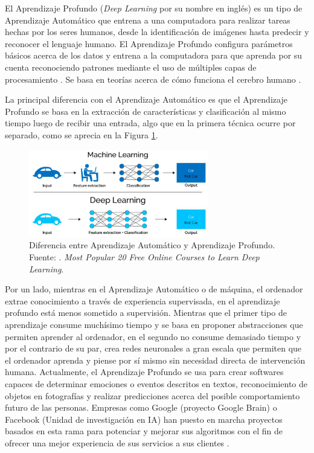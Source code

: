 El Aprendizaje Profundo (\textit{Deep Learning} por su nombre en inglés) es un tipo de Aprendizaje Automático que entrena a una computadora para realizar tareas hechas por los seres humanos, desde la identificación de imágenes hasta predecir y reconocer el lenguaje humano. El Aprendizaje Profundo configura parámetros básicos acerca de los datos y entrena a la computadora para que aprenda por su cuenta reconociendo patrones mediante el uso de múltiples capas de procesamiento \parencite{gl_sas_deeplearning}. Se basa en teorías acerca de cómo funciona el cerebro humano \parencite{tec_banafa2019deeplearning}.

La principal diferencia con el Aprendizaje Automático es que el Aprendizaje Profundo se basa en la extracción de características y clasificación al mismo tiempo luego de recibir una entrada, algo que en la primera técnica ocurre por separado, como se aprecia en la Figura \ref{2:fig5}.
\begin{figure}[!ht]
	\begin{center}
		\includegraphics[width=0.70\textwidth]{2/figures/deeplearning_machinelearning.jpg}
		\caption[Diferencia entre Aprendizaje Automático y Aprendizaje Profundo]{Diferencia entre Aprendizaje Automático y Aprendizaje Profundo.\\
		Fuente: \cite{tec_cook2018deeplearning}. \textit{Most Popular 20 Free Online Courses to Learn Deep Learning}.}
		\label{2:fig5}
	\end{center}
\end{figure}

Por un lado, mientras en el Aprendizaje Automático o de máquina, el ordenador extrae conocimiento a través de experiencia supervisada, en el aprendizaje profundo está menos sometido a supervisión. Mientras que el primer tipo de aprendizaje consume muchísimo tiempo y se basa en proponer abstracciones que permiten aprender al ordenador, en el segundo no consume demasiado tiempo y por el contrario de su par, crea redes neuronales a gran escala que permiten que el ordenador aprenda y piense por sí mismo sin necesidad directa de intervención humana. Actualmente, el Aprendizaje Profundo se usa para crear softwares capaces de determinar emociones o eventos descritos en textos, reconocimiento de objetos en fotografías y realizar predicciones acerca del posible comportamiento futuro de las personas. Empresas como Google (proyecto Google Brain) o Facebook (Unidad de investigación en IA) han puesto en marcha proyectos basados en esta rama para potenciar y mejorar sus algoritmos con el fin de ofrecer una mejor experiencia de sus servicios a sus clientes \parencite{tec_banafa2019deeplearning}.

